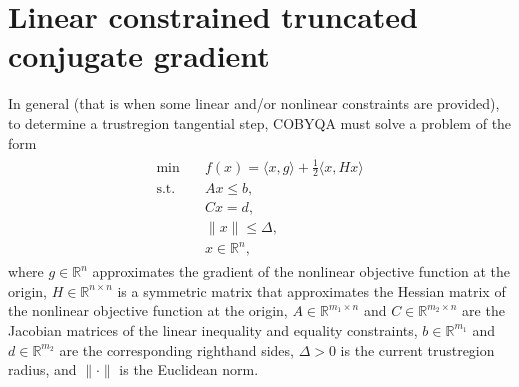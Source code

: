 \documentclass[letterpaper,10pt,english]{sphinxmanual}
\newcommand{\norm}[2][]{#1\lVert#2#1\rVert}
\newcommand{\inner}[2][]{#1\langle#2#1\rangle}
\def\R{\ensuremath{\mathds{R}}}
\begin{document}
\section{Linear constrained truncated conjugate gradient}
\label{\detokenize{algo/linalg.lctcg:linear-constrained-truncated-conjugate-gradient}}\label{\detokenize{algo/linalg.lctcg:linalg-lctcg}}\label{\detokenize{algo/linalg.lctcg::doc}}
\sphinxAtStartPar
In general (that is when some linear and/or nonlinear constraints are
provided), to determine a trust\sphinxhyphen{}region tangential step, COBYQA must solve a
problem of the form
\begin{equation}\label{equation:algo/linalg.lctcg:lctcg}
\begin{split}\begin{array}{ll}
    \min        & \quad f(x) = \inner{x, g} + \frac{1}{2} \inner{x, H x}\\
    \text{s.t.} & \quad Ax \le b,\\
                & \quad Cx = d,\\
                & \quad \norm{x} \le \Delta,\\
                & \quad x \in \R^n,
\end{array}\end{split}
\end{equation}
\sphinxAtStartPar
where \(g \in \R^n\) approximates the gradient of the nonlinear objective
function at the origin, \(H \in \R^{n \times n}\) is a symmetric matrix
that approximates the Hessian matrix of the nonlinear objective function at the
origin, \(A \in \R^{m_1 \times n}\) and \(C \in \R^{m_2 \times n}\) are
the Jacobian matrices of the linear inequality and equality constraints,
\(b \in \R^{m_1}\) and \(d \in \R^{m_2}\) are the corresponding
right\sphinxhyphen{}hand sides, \(\Delta > 0\) is the current trust\sphinxhyphen{}region radius, and
\(\norm{\cdot}\) is the Euclidean norm.
\end{document}
